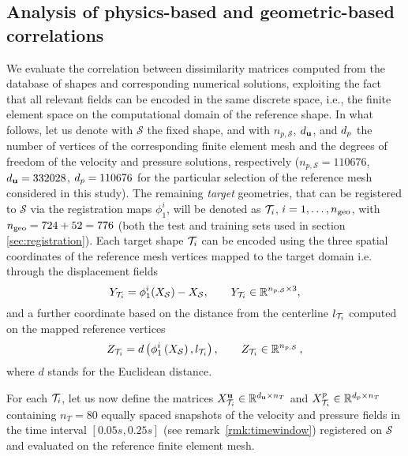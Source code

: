 \subsection{Analysis of physics-based and geometric-based correlations}
\label{subsec:sml_correlations}
We evaluate the correlation between dissimilarity matrices computed from the database of shapes and corresponding numerical solutions, exploiting
the fact that all relevant fields can be encoded in the same discrete space, i.e., the finite element space on the computational domain of the reference shape.
%
In what follows, let us denote with $\mathcal{S}$ the fixed shape, and with $n_{p, \mathcal{S}}$, $d_{\mathbf u}$, and $d_p$ the number of vertices of the
corresponding finite element mesh and the degrees of freedom of the velocity and pressure solutions, respectively ($n_{p, \mathcal{S}}=110676$, $d_{\mathbf u} = 332028$, $d_p = 110676$ for the particular selection of the reference mesh considered in this study).
The remaining \textit{target} geometries, that can be registered to $\mathcal{S}$ via the registration maps
$\phi_1^i$, will be denoted
as $\mathcal T_{i}$, $i=1,\hdots,n_{\rm geo}$, with $n_{\rm geo} = 724 + 52 = 776$ (both the test and training sets used in section  \ref{sec:registration}).
%
Each target shape $\mathcal T_{i}$ can be encoded using the three spatial coordinates of the reference mesh vertices mapped to the target domain i.e. through the displacement fields
\begin{equation*}
  Y_{\mathcal T_{i}} = \phi^i_1(X_{\mathcal S})-X_{\mathcal S}, \qquad Y_{\mathcal T_{i}}\in\mathbb{R}^{n_{p,\mathcal S} \times 3}, 
\end{equation*}
and a further coordinate based on the distance from the centerline $l_{\mathcal T_{i}}$ computed on the mapped reference vertices
\begin{equation}
  \label{eq:enc_geo}
  Z_{\mathcal T_{i}} = d\left(\phi^i_1\left(X_{\mathcal S}\right),l_{\mathcal T_{i}} \right),\qquad Z_{\mathcal T_{i}} \in \mathbb{R}^{n_{p,\mathcal S}}\,,
\end{equation}
where $d$ stands for the Euclidean distance.

For each $\mathcal T_{i}$, let us now define the matrices $X^{\mathbf u}_{\mathcal T_{i}} \in\mathbb{R}^{d_{\mathbf u} \times n_T}$  and 
$X^{p}_{\mathcal T_{i}}\in\mathbb{R}^{d_p \times n_T}$ containing $n_T=80$ equally spaced snapshots of the velocity and pressure fields in the time interval $[0.05s, 0.25 s]$ (see remark~\ref{rmk:timewindow}) registered on $\mathcal{S}$ and evaluated on the reference finite element mesh.
%


